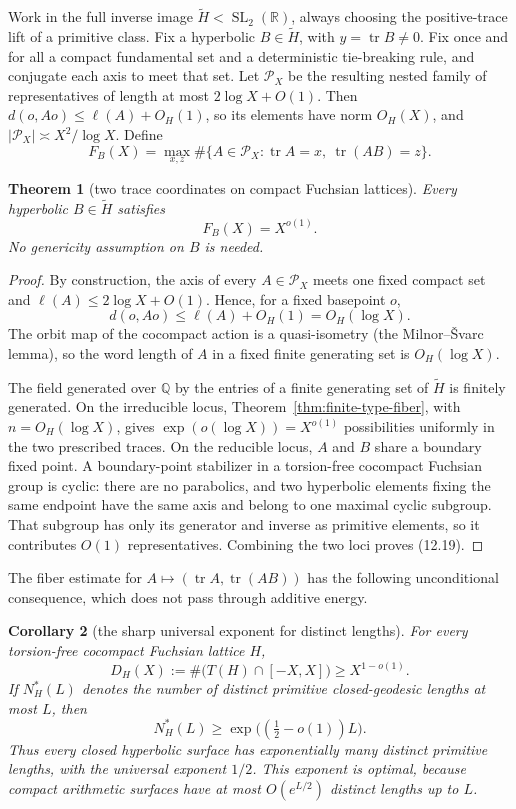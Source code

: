 \documentclass[11pt,reqno]{amsart}
\newtheorem{theorem}{Theorem}[section]
\newtheorem{corollary}[theorem]{Corollary}
\theoremstyle{definition}
\theoremstyle{remark}
\newcommand{\R}{\mathbb R}
\newcommand{\Q}{\mathbb Q}
\newcommand{\Tr}{\operatorname{tr}}
\newcommand{\SL}{\operatorname{SL}}
\begin{document}
Work in the full inverse image \(\widetilde H<\SL_2(\R)\), always choosing
the positive-trace lift of a primitive class.  Fix a hyperbolic
\(B\in\widetilde H\), with \(y=\Tr B\ne0\).  Fix once and for all a compact
fundamental set and a deterministic tie-breaking rule, and conjugate each
axis to meet that set.  Let \(\mathcal P_X\) be the resulting nested family
of representatives of length at most \(2\log X+O(1)\).  Then
\(d(o,Ao)\le\ell(A)+O_H(1)\), so its elements have norm \(O_H(X)\), and
\(|\mathcal P_X|\asymp X^2/\log X\).  Define
\[
 F_B(X)=\max_{x,z}\#\{A\in\mathcal P_X:\Tr A=x,\ \Tr(AB)=z\}.
\tag{12.18}
\]

\begin{theorem}[two trace coordinates on compact Fuchsian lattices]
\label{thm:surface-fiber}
Every hyperbolic \(B\in\widetilde H\) satisfies
\[
 F_B(X)=X^{o(1)}.
\tag{12.19}
\]
No genericity assumption on \(B\) is needed.
\end{theorem}

\begin{proof}
By construction, the axis of every \(A\in\mathcal P_X\) meets one fixed
compact set and \(\ell(A)\le2\log X+O(1)\).  Hence, for a fixed basepoint
\(o\),
\[
 d(o,Ao)\le\ell(A)+O_H(1)=O_H(\log X).
\]
The orbit map of the cocompact action is a quasi-isometry
(the Milnor--Švarc lemma), so the word length of \(A\) in a fixed finite
generating set is \(O_H(\log X)\).

The field generated over \(\Q\) by the entries of a finite generating set
of \(\widetilde H\) is finitely generated.  On the irreducible locus,
Theorem~\ref{thm:finite-type-fiber}, with \(n=O_H(\log X)\), gives
\(\exp(o(\log X))=X^{o(1)}\) possibilities uniformly in the two prescribed
traces.  On the reducible
locus, \(A\) and \(B\) share a boundary fixed point.  A boundary-point
stabilizer in a torsion-free cocompact Fuchsian group is cyclic: there are no
parabolics, and two hyperbolic elements fixing the same endpoint have the
same axis and belong to one maximal cyclic subgroup.  That subgroup has only
its generator and inverse as primitive elements, so it contributes \(O(1)\)
representatives.  Combining the two loci proves (12.19).
\end{proof}

The fiber estimate for
\(A\mapsto(\Tr A,\Tr(AB))\) has the following unconditional consequence,
which does not pass through additive energy.

\begin{corollary}[the sharp universal exponent for distinct lengths]
\label{cor:universal-trace-growth}
For every torsion-free cocompact Fuchsian lattice \(H\),
\[
 D_H(X):=\#\bigl(T(H)\cap[-X,X]\bigr)\ge X^{1-o(1)}.
\]
If \(N_H^*(L)\) denotes the number of distinct primitive closed-geodesic
lengths at most \(L\), then
\[
 N_H^*(L)\ge \exp\bigl((\tfrac12-o(1))L\bigr).
\]
Thus every closed hyperbolic surface has exponentially many distinct
primitive lengths, with the universal exponent \(1/2\).  This exponent is
optimal, because compact arithmetic surfaces have at most
\(O(e^{L/2})\) distinct lengths up to \(L\).
\end{corollary}
\end{document}
